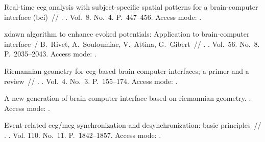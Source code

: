\expandafter\long\expandafter\gdef\csname fullcite@10.1109/86.895947\endcsname{%
 Real-time eeg analysis with
  subject-specific spatial patterns for a brain-computer interface (bci)~//
  \href{http://dx.doi.org/10.1109/86.895947}{}. \BibDash
{}. \BibDash
\newblock Vol.~8. No.~4. \BibDash
\newblock P.~447--456. \BibDash
\newblock Access mode: .
}

\expandafter\long\expandafter\gdef\csname fullcite@10.1109/tbme.2009.2012869\endcsname{%
xdawn algorithm to enhance evoked potentials: Application to brain-computer
  interface~/ B.~Rivet, A.~Souloumiac, V.~Attina, G.~Gibert~//
  \href{http://dx.doi.org/10.1109/tbme.2009.2012869}{}. \BibDash
{}. \BibDash
\newblock Vol.~56. No.~8. \BibDash
\newblock P.~2035--2043. \BibDash
\newblock Access mode: .
}

\expandafter\long\expandafter\gdef\csname fullcite@10.1080/2326263x.2017.1297192\endcsname{%
 Riemannian geometry for eeg-based
  brain-computer interfaces; a primer and a review~//
  \href{http://dx.doi.org/10.1080/2326263x.2017.1297192}{}. \BibDash
{}. \BibDash
\newblock Vol.~4. No.~3. \BibDash
\newblock P.~155--174. \BibDash
\newblock Access mode:
  .
}

\expandafter\long\expandafter\gdef\csname fullcite@10.48550/ARXIV.1310.8115\endcsname{%
 A new generation of
  brain-computer interface based on riemannian geometry. \BibDash
{}. \BibDash
\newblock Access mode: .
}

\expandafter\long\expandafter\gdef\csname fullcite@10.1016/s1388-2457-99-00141-8\endcsname{%
 Event-related eeg/meg
  synchronization and desynchronization: basic principles~//
  \href{http://dx.doi.org/10.1016/s1388-2457(99)00141-8}{}. \BibDash
{}. \BibDash
\newblock Vol. 110. No.~11. \BibDash
\newblock P.~1842--1857. \BibDash
\newblock Access mode:
  .
}

